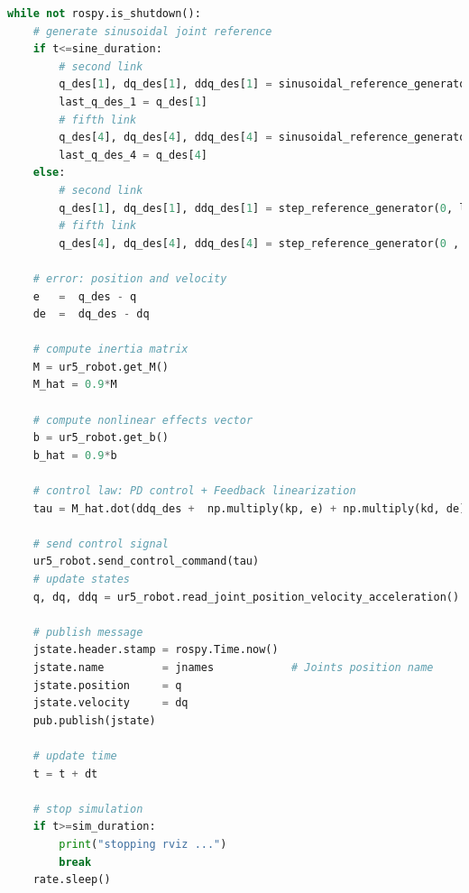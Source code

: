 \begin{lstlisting}[language=Python,caption={Move the second and fifth joint of UR5 robot with the required movement of activity 2.5.}, label={lst:inverse_dynamics_uncertainty_cancellation}]
while not rospy.is_shutdown():
    # generate sinusoidal joint reference
    if t<=sine_duration:
        # second link
        q_des[1], dq_des[1], ddq_des[1] = sinusoidal_reference_generator(q0[1], 0.2, 1, t)
        last_q_des_1 = q_des[1]
        # fifth link
        q_des[4], dq_des[4], ddq_des[4] = sinusoidal_reference_generator(q0[4], 0.4, 1.5, t)  
        last_q_des_4 = q_des[4]  
    else:
        # second link
        q_des[1], dq_des[1], ddq_des[1] = step_reference_generator(0, last_q_des_1)
        # fifth link
        q_des[4], dq_des[4], ddq_des[4] = step_reference_generator(0 , last_q_des_4)

    # error: position and velocity
    e 	=  q_des - q
    de 	=  dq_des - dq    

    # compute inertia matrix
    M = ur5_robot.get_M()
    M_hat = 0.9*M

    # compute nonlinear effects vector
    b = ur5_robot.get_b()   
    b_hat = 0.9*b

    # control law: PD control + Feedback linearization
    tau = M_hat.dot(ddq_des +  np.multiply(kp, e) + np.multiply(kd, de)) + b_hat
    
    # send control signal
    ur5_robot.send_control_command(tau)
    # update states
    q, dq, ddq = ur5_robot.read_joint_position_velocity_acceleration()

    # publish message
    jstate.header.stamp = rospy.Time.now()
    jstate.name 		= jnames			# Joints position name
    jstate.position 	= q
    jstate.velocity 	= dq
    pub.publish(jstate)

    # update time
    t = t + dt
    
    # stop simulation
    if t>=sim_duration:
        print("stopping rviz ...")
        break
    rate.sleep()
\end{lstlisting}

